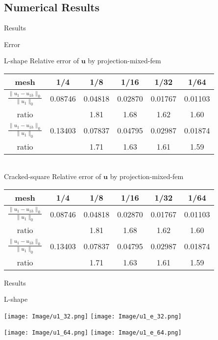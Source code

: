 \documentclass[13pt]{beamer}
\begin{document}
\subsection{Numerical Results}
\begin{frame}[shrink=10]{Results}
   \begin{block}{Error}
   \begin{center}

   {\color{red} L-shape Relative error of $\mathbf{u}$ by projection-mixed-fem}\\[2ex]
   \begin{tabular}{cccccc}
     \hline
     mesh & 1/4 & 1/8 & 1/16 & 1/32 & 1/64 \\
     \hline
     $\frac{\|u_1 - u_{1h}\|_0}{\|u_1\|_0}$ & 0.08746 & 0.04818 & 0.02870 & 0.01767 & 0.01103 \\
     ratio &  & 1.81 & 1.68 & 1.62 & 1.60  \\
     $\frac{\|u_1 - u_{1h}\|_0}{\|u_1\|_0}$ & 0.13403 & 0.07837 & 0.04795 & 0.02987 & 0.01874 \\
     ratio &  & 1.71 & 1.63 & 1.61 & 1.59  \\
     \hline
   \end{tabular}\\[2ex]
   {\color{red} Cracked-square Relative error of $\mathbf{u}$ by projection-mixed-fem}\\[2ex]
      \begin{tabular}{cccccc}
     \hline
     mesh & 1/4 & 1/8 & 1/16 & 1/32 & 1/64 \\
     \hline
     $\frac{\|u_1 - u_{1h}\|_0}{\|u_1\|_0}$ & 0.08746 & 0.04818 & 0.02870 & 0.01767 & 0.01103 \\
     ratio &  & 1.81 & 1.68 & 1.62 & 1.60  \\
     $\frac{\|u_1 - u_{1h}\|_0}{\|u_1\|_0}$ & 0.13403 & 0.07837 & 0.04795 & 0.02987 & 0.01874 \\
     ratio &  & 1.71 & 1.63 & 1.61 & 1.59  \\
     \hline
   \end{tabular}
   \end{center}
   \end{block}
\end{frame}

\begin{frame}[shrink=5]{Results}
  \begin{block}{}
  L-shape
   \begin{center}
     \texttt{[image: Image/u1\_32.png]}
     \texttt{[image: Image/u1\_e\_32.png]}
   \end{center}
   \begin{center}
     \texttt{[image: Image/u1\_64.png]}
     \texttt{[image: Image/u1\_e\_64.png]}
   \end{center}
  \end{block}
\end{frame}
\end{document}
